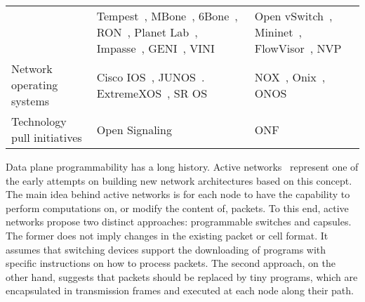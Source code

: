 {\begin{table*}[!htp]
\begin{center}
\begin{tabularx}{\linewidth}{p{\fcwidth}p{\scwidth}p{\tcwidth}}
& \multirow{2}{*}{\begin{minipage}{\scwidth}
		Tempest~\cite{merwe1998},
		MBone~\cite{macedonia1994},
		6Bone~\cite{fink2004},
		RON~\cite{andersen2001},
		Planet Lab~\cite{chun2003},
		Impasse~\cite{anderson2005},
		GENI~\cite{peterson2006},
		VINI~\cite{bavier2006-1}
	\end{minipage}} 
& \multirow{2}{*}{
	\begin{minipage}{\tcwidth}
		Open vSwitch~\cite{pfaff2009},
		Mininet~\cite{lantz2010},
		FlowVisor~\cite{sherwood2010},
		NVP~\cite{koponen}
	\end{minipage}} \\
& & \\
\hline
\multirow{1}{*}{\begin{minipage}{\fcwidth}
		Network operating systems
	\end{minipage}} 
& \multirow{1}{*}{\begin{minipage}{\scwidth}
		Cisco IOS~\cite{bollapragada2000},
		JUNOS~\cite{junipernetworks2012}.
		ExtremeXOS~\cite{extremenetworks2014},
		SR OS~\cite{alcatellucent2014}
	\end{minipage}} 
& \multirow{1}{*}{
	\begin{minipage}{\tcwidth}
		NOX~\cite{gude2008},
		Onix~\cite{koponen-1},
		ONOS~\cite{krishnaswamy2013}
	\end{minipage}} \\
\hline
\multirow{1}{*}{\begin{minipage}{\fcwidth}
		Technology pull initiatives
	\end{minipage}} 
& \multirow{1}{*}{\begin{minipage}{\scwidth}
	Open Signaling~\cite{campbell1999}
	\end{minipage}} 
& \multirow{1}{*}{
	\begin{minipage}{\tcwidth}
	ONF~\cite{onf2013-3}
	\end{minipage}} \\
\hline
\end{tabularx}
\end{center}
\end{table*}
}

Data plane programmability has a long history. Active networks~\cite{tennenhouse1997} 
represent one of the early attempts on building new network architectures based on this concept.
The main idea behind active networks is for each node to have the capability to perform computations 
on, or modify the content of, packets. To this end, active networks propose two distinct approaches: 
programmable switches and capsules. The former does not imply changes in the existing packet or cell 
format. It assumes that switching devices support the downloading of programs with specific instructions 
on how to process packets. The second approach, on the other hand, suggests that packets should be 
replaced by tiny programs, which are encapsulated in transmission frames and executed at each node 
along their path.

